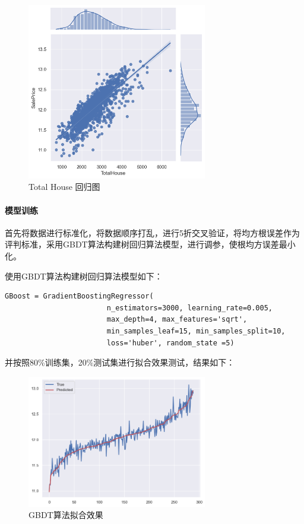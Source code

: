 \documentclass[12pt]{ctexart}
\begin{document}
\begin{figure}[H]
    \centering
    \includegraphics[width=0.7\textwidth]{image/output4-7.png}
    \caption{Total House 回归图}
\end{figure}  

\paragraph{模型训练}

首先将数据进行标准化，将数据顺序打乱，进行5折交叉验证，将均方根误差作为评判标准，采用GBDT算法构建树回归算法模型，进行调参，使根均方误差最小化。

使用GBDT算法构建树回归算法模型如下：

\begin{lstlisting}
GBoost = GradientBoostingRegressor(
                        n_estimators=3000, learning_rate=0.005,
                        max_depth=4, max_features='sqrt',
                        min_samples_leaf=15, min_samples_split=10, 
                        loss='huber', random_state =5)
\end{lstlisting}

并按照80\%训练集，20\%测试集进行拟合效果测试，结果如下：

\begin{figure}[H]
    \centering
    \includegraphics[width=0.7\textwidth]{image/output4-9.png}
    \caption{GBDT算法拟合效果}
\end{figure} 
\end{document}
